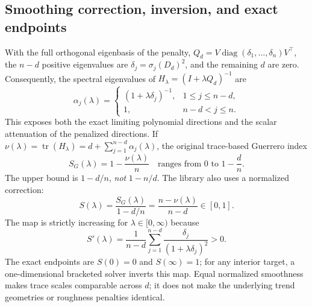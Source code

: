 \subsection{Smoothing correction, inversion, and exact endpoints}
With the full orthogonal eigenbasis of the penalty,
$Q_d=V\operatorname{diag}(\delta_1,\ldots,\delta_n)V^\top$,
the $n-d$ positive eigenvalues are $\delta_j=\sigma_j(D_d)^2$,
and the remaining $d$ are zero. Consequently, the spectral
eigenvalues of $H_\lambda=(I+\lambda Q_d)^{-1}$ are
\begin{equation}\label{eq:h-alpha}
\alpha_j(\lambda)=
\begin{cases}(1+\lambda\delta_j)^{-1},&1\le j\le n-d,\\
1,&n-d<j\le n.\end{cases}
\end{equation}
This exposes both the exact limiting polynomial directions and
the scalar attenuation of the penalized directions. If
$\nu(\lambda)=\operatorname{tr}(H_\lambda)
=d+\sum_{j=1}^{n-d}\alpha_j(\lambda)$, the original
trace-based Guerrero index
\begin{equation}\label{eq:original-scale}
S_G(\lambda)=1-\frac{\nu(\lambda)}n
\quad\text{ranges from }0\text{ to }1-\frac dn.
\end{equation}
The upper bound is $1-d/n$, \emph{not} $1-n/d$.
The library also uses a normalized correction:
\begin{equation}\label{eq:normalized-scale}
S(\lambda)=\frac{S_G(\lambda)}{1-d/n}
=\frac{n-\nu(\lambda)}{n-d}\in[0,1].
\end{equation}
The map is strictly increasing for $\lambda\in[0,\infty)$
because
\begin{equation}\label{eq:s-derivative}
S'(\lambda)=\frac{1}{n-d}\sum_{j=1}^{n-d}
\frac{\delta_j}{(1+\lambda\delta_j)^2}>0.
\end{equation}
The exact endpoints are $S(0)=0$ and $S(\infty)=1$;
for any interior target, a one-dimensional bracketed solver
inverts this map. Equal normalized smoothness makes trace scales
comparable across $d$; it does not make the underlying trend
geometries or roughness penalties identical.

